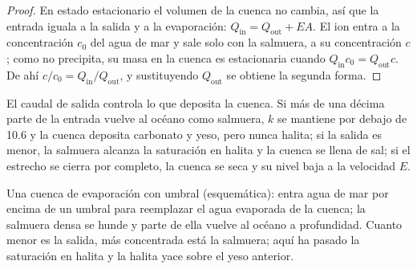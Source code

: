 \begin{proof}
En estado estacionario el volumen de la cuenca no cambia, así que la entrada iguala a la salida y a la evaporación: $Q_{\mathrm{in}} = Q_{\mathrm{out}} +
EA$. El ion entra a la concentración $c_0$ del agua de mar y sale solo con la salmuera, a su concentración $c$; como no precipita, su masa en la cuenca es estacionaria
cuando $Q_{\mathrm{in}}c_0 = Q_{\mathrm{out}}c$. De ahí $c/c_0 =
Q_{\mathrm{in}}/Q_{\mathrm{out}}$, y sustituyendo $Q_{\mathrm{out}}$ se obtiene la segunda forma.
\end{proof}

El caudal de salida controla lo que deposita la cuenca. Si más de una décima parte de la entrada vuelve al océano como salmuera, $k$ se mantiene por debajo de 10.6 y la cuenca deposita
carbonato y yeso, pero nunca halita; si la salida es menor, la salmuera alcanza la saturación en halita y la cuenca se llena de sal; si el estrecho se cierra por completo, la cuenca se seca y su nivel
baja a la velocidad $E$.

\begin{omfigure}

{\small Una cuenca de evaporación con umbral (esquemática): entra agua de mar por encima de un umbral para reemplazar el agua evaporada de la cuenca; la salmuera densa se hunde y
parte de ella vuelve al océano a profundidad. Cuanto menor es la salida, más concentrada está la salmuera; aquí ha pasado la saturación en halita y la halita yace sobre el yeso anterior.}
\label{fig:b1:chemical-biogenic-sediments:barred}
\end{omfigure}

